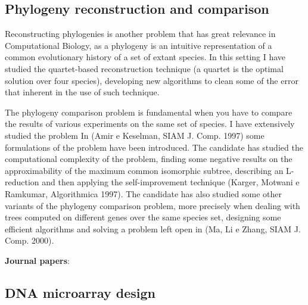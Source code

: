 \documentclass[11pt,a4paper,roman]{moderncv}
\begin{document}
\subsection{Phylogeny reconstruction and
comparison}\label{phylogeny-reconstruction-and-comparison}

Reconstructing phylogenies is another problem that has great relevance
in Computational Biology, as a phylogeny is an intuitive representation
of a common evolutionary history of a set of extant species. In this
setting I have studied the quartet-based reconstruction technique (a
quartet is the optimal solution over four species), developing new
algorithms to clean some of the error that inherent in the use of such
technique.

The phylogeny comparison problem is fundamental when you have to compare
the results of various experiments on the same set of species. I have
extensively studied the problem In (Amir e Keselman, SIAM J. Comp. 1997)
some formulations of the problem have been introduced. The candidate has
studied the computational complexity of the problem, finding some
negative results on the approximability of the maximum common isomorphic
subtree, describing an L-reduction and then applying the
self-improvement technique (Karger, Motwani e Ramkumar, Algorithmica
1997). The candidate has also studied some other variants of the
phylogeny comparison problem, more precisely when dealing with trees
computed on different genes over the same species set, designing some
efficient algorithms and solving a problem left open in (Ma, Li e Zhang,
SIAM J. Comp. 2000).

\textbf{Journal
papers}:~\cite{DBLP:journals/jcb/AliCLVP21,DBLP:journals/bioinformatics/CiccolellaRGPSB21,DBLP:journals/bioinformatics/CiccolellaBDBPV21,DBLP:journals/bmcbi/CiccolellaGPVHB20,DBLP:journals/tcbb/BonizzoniCVS19,DBLP:journals/tcs/BonizzoniCVRT17,DBLP:journals/fuin/BonizzoniCVRT17,bonizzoniExplainingEvolutionConstrained2014,DBLP:journals/tcs/BonizzoniVD05,DBLP:journals/bioinformatics/VedovaW02,DBLP:journals/ijfcs/BonizzoniVM00}

\subsection{DNA microarray design}\label{dna-microarray-design}
\end{document}
